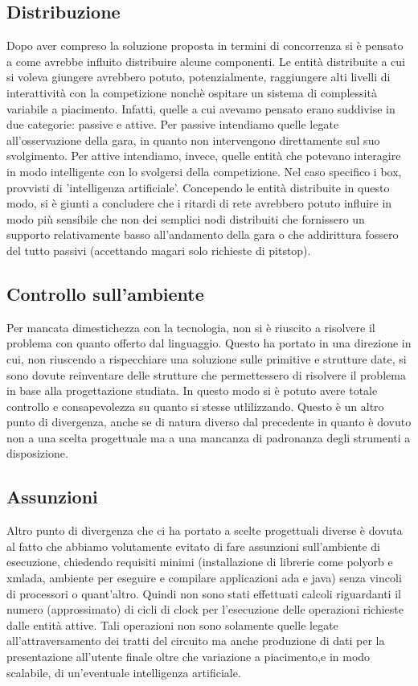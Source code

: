 \subsection{Distribuzione}
Dopo aver compreso la soluzione proposta in termini di concorrenza si è pensato a come avrebbe influito distribuire alcune componenti. Le entità distribuite a cui si voleva giungere avrebbero potuto, potenzialmente, raggiungere alti livelli di interattività con la competizione nonchè ospitare un sistema di complessità variabile a piacimento.
Infatti, quelle a cui avevamo pensato erano suddivise in due categorie: passive e attive. Per passive intendiamo quelle legate all'osservazione della gara, in quanto non intervengono direttamente sul suo svolgimento. Per attive intendiamo, invece, quelle entità che potevano interagire in modo intelligente con lo svolgersi della competizione. Nel caso specifico i box, provvisti di 'intelligenza artificiale'. Concependo le entità distribuite in questo modo, si è giunti a concludere che i ritardi di rete avrebbero potuto influire in modo più sensibile che non dei semplici nodi distribuiti che fornissero un supporto relativamente basso all'andamento della gara o che addirittura fossero del tutto passivi (accettando magari solo richieste di pitstop).
\subsection{Controllo sull'ambiente}
Per mancata dimestichezza con la tecnologia, non si è riuscito a risolvere il problema con quanto offerto dal linguaggio. Questo ha portato in una direzione in cui, non riuscendo a rispecchiare una soluzione sulle primitive e strutture date, si sono dovute reinventare delle strutture che permettessero di risolvere il problema in base alla progettazione studiata. In questo modo si è potuto avere totale controllo e consapevolezza su quanto si stesse utlilizzando. Questo è un altro punto di divergenza, anche se di natura diverso dal precedente in quanto è dovuto non a una scelta progettuale ma a una mancanza di padronanza degli strumenti a disposizione.
\subsection{Assunzioni}
Altro punto di divergenza che ci ha portato a scelte progettuali diverse è dovuta al fatto che abbiamo volutamente evitato di fare assunzioni sull'ambiente di esecuzione, chiedendo requisiti minimi (installazione di librerie come polyorb e xmlada, ambiente per eseguire e compilare applicazioni ada e java) senza vincoli di processori o quant'altro. Quindi non sono stati effettuati calcoli riguardanti il numero (approssimato) di cicli di clock per l'esecuzione delle operazioni richieste dalle entità attive. Tali operazioni non sono solamente quelle legate all’attraversamento dei tratti del circuito ma anche produzione di dati per la presentazione all'utente finale oltre che variazione a piacimento,e in modo scalabile, di un'eventuale intelligenza artificiale.
